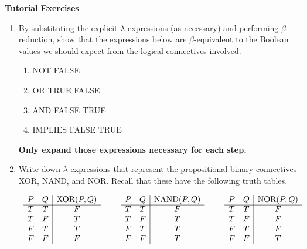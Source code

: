 \documentclass[11pt]{report}
\begin{document}
\newpage
{\bf Tutorial Exercises}
\begin{enumerate}
	
	\item By substituting the explicit $\lambda$-expressions (as necessary) and performing $\beta$-reduction, show that the expressions below are $\beta$-equivalent to the Boolean values we should expect from the logical connectives involved.
	
		\begin{enumerate}
			\item NOT FALSE \vspace{0.5cm}
			\item OR TRUE FALSE \vspace{0.5cm}
			\item AND FALSE TRUE \vspace{0.5cm}
			\item IMPLIES FALSE TRUE 
		\end{enumerate} 

	{\bf Only expand those expressions necessary for each step.}
		
	\item Write down $\lambda$-expressions that represent the propositional binary connectives XOR, NAND, and NOR. Recall that these have the following truth tables.
			
	\vspace{0.5cm}

	\begin{center}
		$\begin{array}{c c c}

			\begin{array}{ c c | c }			
				P & Q & \text{XOR}(P,Q)\\
				\cline{1 - 3}
				T & T & F \\ 
				T & F & T \\ 
				F & T & T \\ 
				F & F & F
			\end{array} 
			& \hspace{0.5cm}
			\begin{array}{ c c | c }			
				P & Q & \text{NAND}(P,Q)\\
				\cline{1 - 3}
				T & T & F \\ 
				T & F & T \\ 
				F & T & T \\ 
				F & F & T
			\end{array} 
			& \hspace{0.5cm}
			\begin{array}{ c c | c }			
				P & Q & \text{NOR}(P,Q)\\
				\cline{1 - 3}
				T & T & F \\ 
				T & F & F \\ 
				F & T & F \\ 
				F & F & T
			\end{array} 
		\end{array}$
	\end{center}
	\vspace{0.2cm}


\end{enumerate}
\end{document}
